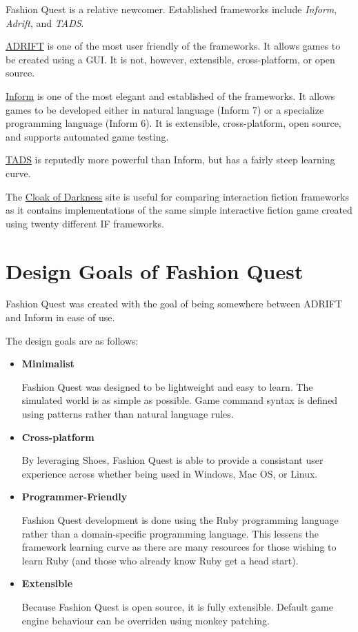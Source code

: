 \documentclass[letterpaper,10pt,english]{sphinxmanual}
\begin{document}
Fashion Quest is a relative newcomer. Established frameworks include \emph{Inform}, \emph{Adrift}, and \emph{TADS}.

\href{http://www.adrift.org.uk/}{ADRIFT} is one of the most user friendly of the frameworks. It allows games to be created using a GUI. It is not, however, extensible, cross-platform, or open source.

\href{http://www.inform-fiction.org/I7/Welcome.html}{Inform} is one of the most elegant and established of the frameworks. It allows games to be developed either in natural language (Inform 7) or a specialize programming language (Inform 6). It is extensible, cross-platform, open source, and supports automated game testing.

\href{http://www.tads.org/}{TADS} is reputedly more powerful than Inform, but has a fairly steep learning curve.

The \href{http://www.firthworks.com/roger/cloak/index.html}{Cloak of Darkness} site is useful for comparing interaction fiction frameworks as it contains implementations of the same simple interactive fiction game created using twenty different IF frameworks.


\section{Design Goals of Fashion Quest}
\label{introduction:design-goals-of-fashion-quest}\label{introduction:id1}
Fashion Quest was created with the goal of being somewhere between ADRIFT and Inform in ease of use.

The design goals are as follows:
\begin{itemize}
\item {} 
\textbf{Minimalist}

Fashion Quest was designed to be lightweight and easy to learn. The simulated world is as simple as possible. Game command syntax is defined using patterns rather than natural language rules.

\item {} 
\textbf{Cross-platform}

By leveraging Shoes, Fashion Quest is able to provide a consistant user experience across whether being used in Windows, Mac OS, or Linux.

\item {} 
\textbf{Programmer-Friendly}

Fashion Quest development is done using the Ruby programming language rather than a domain-specific programming language. This lessens the framework learning curve as there are many resources for those wishing to learn Ruby (and those who already know Ruby get a head start).

\item {} 
\textbf{Extensible}

Because Fashion Quest is open source, it is fully extensible. Default game engine behaviour can be overriden using monkey patching.

\end{itemize}
\end{document}
